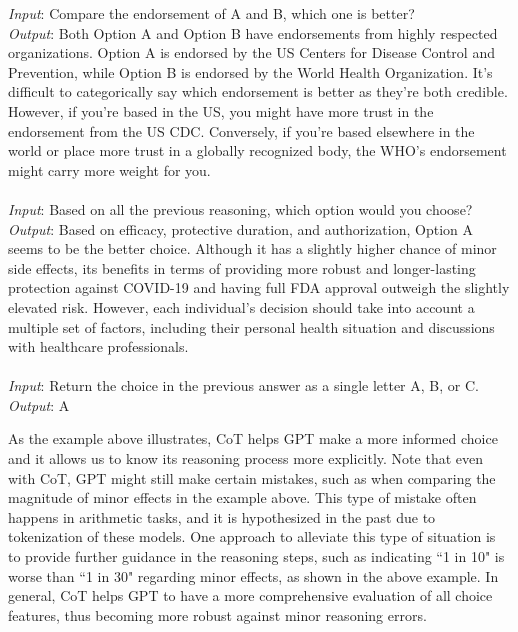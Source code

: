 \begin{mdframed}
{\textit{Input}: Compare the endorsement of A and B, which one is better?\\
\textit{Output}: Both Option A and Option B have endorsements from highly respected organizations. Option A is endorsed by the US Centers for Disease Control and Prevention, while Option B is endorsed by the World Health Organization. It's difficult to categorically say which endorsement is better as they're both credible. However, if you're based in the US, you might have more trust in the endorsement from the US CDC. Conversely, if you're based elsewhere in the world or place more trust in a globally recognized body, the WHO's endorsement might carry more weight for you.\\\\
\textit{Input}: Based on all the previous reasoning, which option would you choose?\\
\textit{Output}: Based on efficacy, protective duration, and authorization, Option A seems to be the better choice. Although it has a slightly higher chance of minor side effects, its benefits in terms of providing more robust and longer-lasting protection against COVID-19 and having full FDA approval outweigh the slightly elevated risk. However, each individual's decision should take into account a multiple set of factors, including their personal health situation and discussions with healthcare professionals.\\\\
\textit{Input}: Return the choice in the previous answer as a single letter A, B, or C.\\
\textit{Output}: A
}
\end{mdframed}
\vspace{15pt}

As the example above illustrates, CoT helps GPT make a more informed choice and it allows us to know its reasoning process more explicitly. Note that even with CoT, GPT might still make certain mistakes, such as when comparing the magnitude of minor effects in the example above. This type of mistake often happens in arithmetic tasks, and it is hypothesized in the past due to tokenization of these models. One approach to alleviate this type of situation is to provide further guidance in the reasoning steps, such as indicating ``1 in 10" is worse than ``1 in 30" regarding minor effects, as shown in the above example. In general, CoT helps GPT to have a more comprehensive evaluation of all choice features, thus becoming more robust against minor reasoning errors. 
  
